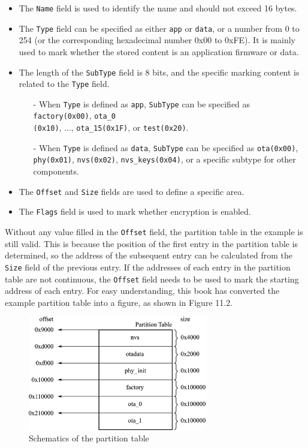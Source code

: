 \documentclass[a4paper,12pt,openany]{book}
\begin{document}
\begin{itemize}[leftmargin=1em]
    \item The \verb|Name| field is used to identify the name and should not exceed 16 bytes.
    \item The \verb|Type| field can be specified as either \verb|app| or \verb|data|, or a number from 0 to 254 (or the corresponding hexadecimal number 0x00 to 0xFE). It is mainly used to mark whether the stored content is an application firmware or data.
    \item The length of the \verb|SubType| field is 8 bits, and the specific marking content is related to the \verb|Type| field.
    \begin{itemize}[leftmargin=1em]
        \item[-] When \verb|Type| is defined as \verb|app|, \verb|SubType| can be specified as \verb|factory(0x00)|, \verb|ota_0|\\ \verb|(0x10)|, ..., \verb|ota_15(0x1F)|, or \verb|test(0x20)|.
        \item[-] When \verb|Type| is defined as \verb|data|, \verb|SubType| can be specified as \verb|ota(0x00)|, \verb|phy(0x01)|, \verb|nvs(0x02)|, \verb|nvs_keys(0x04)|, or a specific subtype for other components.
    \end{itemize}
    \item The \verb|Offset| and \verb|Size| fields are used to define a specific area.
    \item The \verb|Flags| field is used to mark whether encryption is enabled.
\end{itemize}

Without any value filled in the \verb|Offset| field, the partition table in the example is still valid. This is because the position of the first entry in the partition table is determined, so the address of the subsequent entry can be calculated from the \verb|Size| field of the previous entry. If the addresses of each entry in the partition table are not continuous, the \verb|Offset| field needs to be used to mark the starting address of each entry. For easy understanding, this book has converted the example partition table into a figure, as shown in Figure 11.2.

\begin{figure}[!h]
    \centering
    \includegraphics[width=0.7\textwidth]{D11Z/11-2}
    \caption{Schematics of the partition table}
\end{figure}
\end{document}
